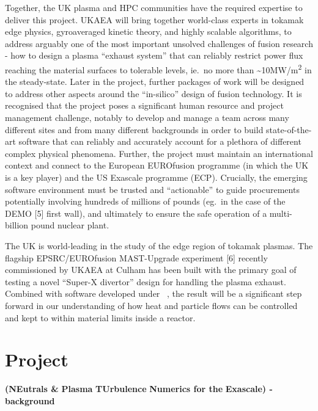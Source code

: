 Together, the UK plasma and HPC communities have the required expertise to deliver 
this project. UKAEA will bring together world-class experts in tokamak edge physics, 
gyroaveraged kinetic theory, and highly scalable algorithms, to address arguably one of 
the most important unsolved challenges of fusion research - how to design a plasma 
``exhaust system'' that can reliably restrict power flux reaching the material 
surfaces to tolerable levels, ie.\ no more than \textasciitilde{}10MW/m\textsuperscript{2} 
in the steady-state. Later in the project, further packages of work will be designed 
to address other aspects around the ``in-silico'' design of fusion technology. 
It is recognised that the project poses a significant human resource and project 
management challenge, notably to develop and manage a team across many different 
sites and from many different backgrounds in order to build state-of-the-art software 
that can reliably and accurately account for a plethora of different complex physical 
phenomena. Further, the project must maintain an international context and connect 
to the European EUROfusion programme (in which the UK is a key player) and the 
US Exascale programme (ECP). Crucially, the emerging software environment must 
be trusted and ``actionable'' to guide procurements potentially involving hundreds 
of millions of pounds (eg.\ in the case of the  DEMO [5] first 
wall), and ultimately to ensure the safe operation of a multi-billion pound nuclear 
plant.

The UK is world-leading in the study of the edge region of tokamak plasmas. The 
flagship EPSRC/EUROfusion MAST-Upgrade experiment [6] recently 
commissioned by UKAEA at Culham has been built with the primary goal of testing 
a novel ``Super-X divertor'' design for handling the plasma exhaust. Combined with 
software developed under \exc \  , the result will be a significant step forward 
in our understanding of how heat and particle flows can be controlled and kept 
to within material limits inside a reactor.

\section*{{\huge{}{ \textbf{Project \nep \  }}}}

\textbf{(}{\textbf{NE}}\textbf{utrals \& }{\textbf{P}}\textbf{lasma 
}{\textbf{TU}}\textbf{rbulence }{\textbf{N}}\textbf{umerics 
for the }{\textbf{E}}\textbf{xascale) - background}

